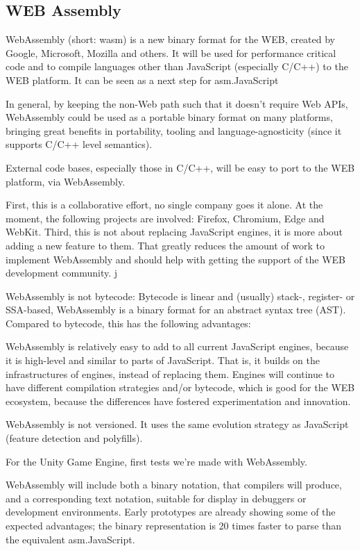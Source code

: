 \subsection{WEB Assembly}

WebAssembly (short: wasm) is a new binary format for the WEB, created by Google, Microsoft, Mozilla and others. It will be used for performance critical code and to compile languages other than JavaScript (especially C/C++) to the WEB platform. It can be seen as a next step for asm.JavaScript 

In general, by keeping the non-Web path such that it doesn't require Web APIs, WebAssembly could be used as a portable binary format on many platforms, bringing great benefits in portability, tooling and language-agnosticity (since it supports C/C++ level semantics).


External code bases, especially those in C/C++, will be easy to port to the WEB platform, via WebAssembly.

First, this is a collaborative effort, no single company goes it alone. At the moment, the following projects are involved: Firefox, Chromium, Edge and WebKit.
Third, this is not about replacing JavaScript engines, it is more about adding a new feature to them. That greatly reduces the amount of work to implement WebAssembly and should help with getting the support of the WEB development community.
j

WebAssembly is not bytecode: Bytecode is linear and (usually) stack-, register- or SSA-based, WebAssembly is a binary format for an abstract syntax tree (AST). Compared to bytecode, this has the following advantages:

WebAssembly is relatively easy to add to all current JavaScript engines, because it is high-level and similar to parts of JavaScript. That is, it builds on the infrastructures of engines, instead of replacing them. Engines will continue to have different compilation strategies and/or bytecode, which is good for the WEB ecosystem, because the differences have fostered experimentation and innovation.

WebAssembly is not versioned. It uses the same evolution strategy as JavaScript (feature detection and polyfills).

For the Unity Game Engine, first tests we're made with WebAssembly.

WebAssembly will include both a binary notation, that compilers will produce, and a corresponding text notation, suitable for display in debuggers or development environments. Early prototypes are already showing some of the expected advantages; the binary representation is 20 times faster to parse than the equivalent asm.JavaScript.

